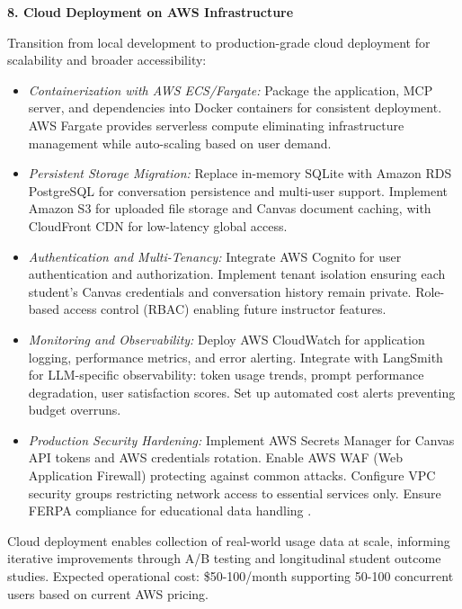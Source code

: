\documentclass{article}
\begin{document}
\textbf{8. Cloud Deployment on AWS Infrastructure}

Transition from local development to production-grade cloud deployment for scalability and broader accessibility:

\begin{itemize}
\item \textit{Containerization with AWS ECS/Fargate:} Package the application, MCP server, and dependencies into Docker containers for consistent deployment. AWS Fargate provides serverless compute eliminating infrastructure management while auto-scaling based on user demand.

\item \textit{Persistent Storage Migration:} Replace in-memory SQLite with Amazon RDS PostgreSQL for conversation persistence and multi-user support. Implement Amazon S3 for uploaded file storage and Canvas document caching, with CloudFront CDN for low-latency global access.

\item \textit{Authentication and Multi-Tenancy:} Integrate AWS Cognito for user authentication and authorization. Implement tenant isolation ensuring each student's Canvas credentials and conversation history remain private. Role-based access control (RBAC) enabling future instructor features.

\item \textit{Monitoring and Observability:} Deploy AWS CloudWatch for application logging, performance metrics, and error alerting. Integrate with LangSmith for LLM-specific observability: token usage trends, prompt performance degradation, user satisfaction scores. Set up automated cost alerts preventing budget overruns.

\item \textit{Production Security Hardening:} Implement AWS Secrets Manager for Canvas API tokens and AWS credentials rotation. Enable AWS WAF (Web Application Firewall) protecting against common attacks. Configure VPC security groups restricting network access to essential services only. Ensure FERPA compliance for educational data handling \cite{genai2024higher}.
\end{itemize}

Cloud deployment enables collection of real-world usage data at scale, informing iterative improvements through A/B testing and longitudinal student outcome studies. Expected operational cost: \$50-100/month supporting 50-100 concurrent users based on current AWS pricing.
\end{document}
